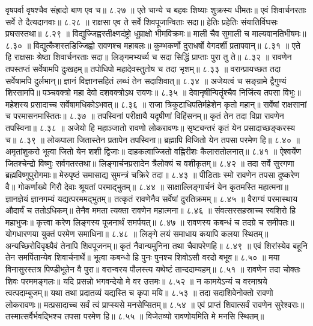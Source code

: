 वृषपर्वा वृषश्चैव संह्रादो बाण एव च॥ ८.२७ ॥
एते चान्ये च बहवः शिष्याः शुक्रस्य धीमतः॥
एवं शिवार्चनरताः सर्वे ते दैत्यदानवाः॥ ८.२८ ॥
राक्षसा एव ते सर्वे शिवपूजान्विताः सदा॥
हेतिः प्रहेतिः संयातिर्विघसः प्रघसस्तथा॥ ८.२९ ॥
विद्युज्जिह्वस्तीक्ष्णदंष्ट्रो धूम्राक्षो भीमविक्रमः॥
माली चैव सुमाली च माल्यवानतिभीषमः॥ ८.३० ॥
विद्युत्कैशस्तडिज्जिह्वो रावणश्च महाबलः॥
कुम्भकर्णो दुराधर्षो वेगदर्शी प्रतापवान्॥ ८.३१ ॥
एते हि राक्षसाः श्रेष्ठा शिवार्चनरताः सदा॥
लिङ्गमभ्यर्च्य च सदा सिद्धिं प्राप्ताः पुरा तु ते॥ ८.३२ ॥
रावणेन तपस्तप्तं सर्वेषामपि दुःखहम्॥
तपोधिपो महादेवस्तुतोष च तदा भृशम्॥ ८.३३ ॥
वरान्प्रायच्छत तदा सर्वेषामपि दुर्लभान्॥
ज्ञानं विज्ञानसहितं लब्धं तेन सदाशिवात्॥ ८.३४ ॥
अजेयत्वं च सङ्ग्रामे द्वैगुण्यं शिरसामपि॥
पञ्चवक्त्रो महा देवो दशवक्त्रोऽथ रावणः॥ ८.३५ ॥
देवानृषीन्पितॄंश्चैव निर्जित्य तपसा विभुः॥
महेशस्य प्रसादाच्च सर्वेषामधिकोऽभवत्॥ ८.३६ ॥
राजा त्रिकूटाधिपतिर्महेशेन कृतो महान्॥
सर्वेषां राक्षसानां च परमासनमास्तितः॥ ८.३७ ॥
तपस्विनां परीक्षायै यदृषीणां विहिंसनम्॥
कृतं तेन तदा विप्रा रावणेन तपस्विना॥ ८.३८ ॥
अजेयो हि महाञ्जातो रावणो लोकरावणः॥
सृष्ट्यन्तरं कृतं येन प्रसादाच्छङ्करस्य च॥ ८.३९ ॥
लोकपाला जितास्तेन प्रतापेन तपस्विना॥
ब्रह्मापि विजितो येन तपसा परमेण हि॥ ८.४० ॥
अमृतांशुकरो भूत्वा जितो येन शशी द्विजाः॥
दाहकत्वाज्जितो वह्निरीशः कैलासतोलनात्॥ ८.४१ ॥
ऐश्वर्येण जितश्चेन्द्रो विष्णुः सर्वगतस्तथा॥
लिङ्गार्चनप्रसादेन त्रैलोक्यं च वशीकृतम्॥ ८.४२ ॥
तदा सर्वे सुरगणा ब्रह्मविष्णुपुरोगमाः॥
मेरुपृष्ठं समासाद्य सुमन्त्रं चक्रिरे तदा॥ ८.४३ ॥
पीडिताः स्मो रावणेन तपसा दुष्करेण वै॥
गोकर्णाख्ये गिरौ देवाः श्रूयतां परमाद्भुतम्॥ ८.४४ ॥
साक्षाल्लिङ्गार्चनं येन कृतमस्ति महात्मना॥
ज्ञानज्ञेयं ज्ञानगम्यं यद्यत्परममद्भुतम्॥
तत्कृतं रावणेनैव सर्वेषां दुरतिक्रमम्॥ ८.४५ ॥
वैराग्यं परमास्थाय औदार्यं च ततोऽधिकम्॥
तेनैव ममता त्यक्ता रावणेन महात्मना॥ ८.४६ ॥
संवत्सरसहस्राच्च स्वशिरो हि महाभुजः॥
कृत्त्वा करेण लिङ्गस्य पूजनार्थं समर्पयत्॥ ८.४७ ॥
रावणस्य कबन्धं च तदग्रे च समीपतः॥
योगधारणया युक्तं परमेण समाधिना॥ ८.४८ ॥
लिङ्गे लयं समाधाय कयापि कलया स्थितम्॥
अन्यच्छिरोविवृश्च्यैवं तेनापि शिवपूजनम्॥
कृतं नैवान्यमुनिना तथा चैवापरेणहि॥ ८.४९ ॥
एवं शिरांस्येव बहूनि तेन समर्पितान्येव शिवार्चनार्थे॥
भूत्वा कबन्धो हि पुनः पुनश्च शिवोऽसौ वरदो बभूव॥ ८.५० ॥
मया विनासुरस्तत्र पिण्डीभूतेन वै पुरा॥
वरान्वरय पौलस्त्य यथेष्टं तान्ददाम्यहम्॥ ८.५१ ॥
रावणेन तदा चोक्तः शिवः परममङ्गलः॥
यदि प्रसन्नो भगवन्देयो मे वर उत्तमः॥ ८.५२ ॥
न कामयेऽन्यं च वरमाश्रये त्वत्पदाम्बुजम्॥
यथा तथा प्रदातव्यं यद्यस्ति च कृपा मयि॥ ८.५३ ॥
तदा सदाशिवेनोक्तो रावणो लोकरावणः॥
मत्प्रसादाच्च सर्वं त्वं प्राप्स्यसे मनसेप्सितम्॥ ८.५४ ॥
एवं प्राप्तं शिवात्सर्वं रावणेन सुरेश्वराः॥
तस्मात्सर्वैर्भवद्भिश्च तपसा परमेण हि॥ ८.५५ ॥
विजेतव्यो रावणोयमिति मे मनसि स्थितम्॥
